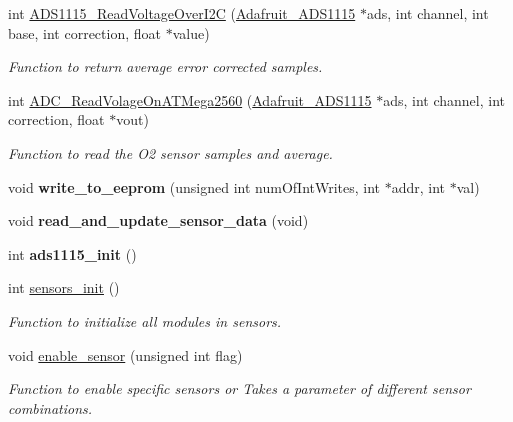 \begin{DoxyCompactItemize}
int \hyperlink{group___ventilator_module_gafcad7e09c08806cd2ce59ea2be30d435}{A\+D\+S1115\+\_\+\+Read\+Voltage\+Over\+I2C} (\hyperlink{class_adafruit___a_d_s1115}{Adafruit\+\_\+\+A\+D\+S1115} $\ast$ads, int channel, int base, int correction, float $\ast$value)
\begin{DoxyCompactList}\small\item\em Function to return average error corrected samples. \end{DoxyCompactList}\item 
int \hyperlink{group___ventilator_module_gaca25626de26b2e71ffd3ee4d0632fd6d}{A\+D\+C\+\_\+\+Read\+Volage\+On\+A\+T\+Mega2560} (\hyperlink{class_adafruit___a_d_s1115}{Adafruit\+\_\+\+A\+D\+S1115} $\ast$ads, int channel, int correction, float $\ast$vout)
\begin{DoxyCompactList}\small\item\em Function to read the O2 sensor samples and average. \end{DoxyCompactList}\item 
\mbox{\label{group___ventilator_module_ga43d30a6f7cb9d12d869ffdcce2f519f3}} 
void {\bfseries write\+\_\+to\+\_\+eeprom} (unsigned int num\+Of\+Int\+Writes, int $\ast$addr, int $\ast$val)
\item 
\mbox{\label{group___ventilator_module_ga61092ae211cf2ff31c238d0c3a76b06f}} 
void {\bfseries read\+\_\+and\+\_\+update\+\_\+sensor\+\_\+data} (void)
\item 
\mbox{\label{group___ventilator_module_ga47f6e329526e773d5ff2b1bceb320d41}} 
int {\bfseries ads1115\+\_\+init} ()
\item 
int \hyperlink{group___ventilator_module_ga91bed606336f32fd112a2a272bd33276}{sensors\+\_\+init} ()
\begin{DoxyCompactList}\small\item\em Function to initialize all modules in sensors. \end{DoxyCompactList}\item 
void \hyperlink{group___ventilator_module_ga882a0452720480e06504493292f2f0e2}{enable\+\_\+sensor} (unsigned int flag)
\begin{DoxyCompactList}\small\item\em Function to enable specific sensors or Takes a parameter of different sensor combinations. \end{DoxyCompactList}\item 

\end{DoxyCompactItemize}
